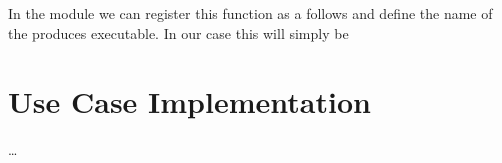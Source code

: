 

In the module  we can register this function as
a  follows and define the name of the
produces executable. In our case this will simply be



\section{Use Case Implementation}

\dots

